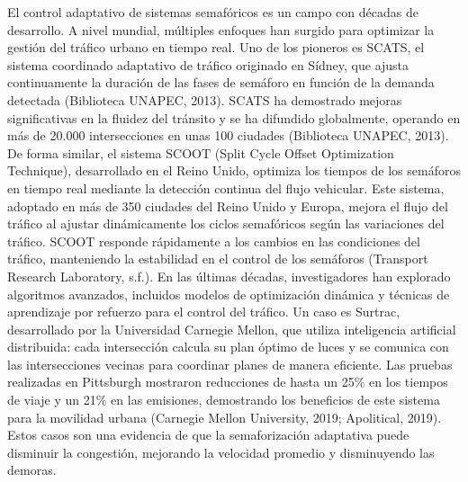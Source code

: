 \documentclass[12pt,a4paper,oneside]{report}
\begin{document}
El control adaptativo de sistemas semafóricos es un campo con décadas de desarrollo. A nivel mundial, múltiples enfoques han surgido para optimizar la gestión del tráfico urbano en tiempo real. Uno de los pioneros es SCATS, el sistema coordinado adaptativo de tráfico originado en Sídney, que ajusta continuamente la duración de las fases de semáforo en función de la demanda detectada (Biblioteca UNAPEC, 2013). SCATS ha demostrado mejoras significativas en la fluidez del tránsito y se ha difundido globalmente, operando en más de 20.000 intersecciones en unas 100 ciudades (Biblioteca UNAPEC, 2013). De forma similar, el sistema SCOOT (Split Cycle Offset Optimization Technique), desarrollado en el Reino Unido, optimiza los tiempos de los semáforos en tiempo real mediante la detección continua del flujo vehicular. Este sistema, adoptado en más de 350 ciudades del Reino Unido y Europa, mejora el flujo del tráfico al ajustar dinámicamente los ciclos semafóricos según las variaciones del tráfico. SCOOT responde rápidamente a los cambios en las condiciones del tráfico, manteniendo la estabilidad en el control de los semáforos (Transport Research Laboratory, s.f.). En las últimas décadas, investigadores han explorado algoritmos avanzados, incluidos modelos de optimización dinámica y técnicas de aprendizaje por refuerzo para el control del tráfico. Un caso es Surtrac, desarrollado por la Universidad Carnegie Mellon, que utiliza inteligencia artificial distribuida: cada intersección calcula su plan óptimo de luces y se comunica con las intersecciones vecinas para coordinar planes de manera eficiente. Las pruebas realizadas en Pittsburgh mostraron reducciones de hasta un 25\% en los tiempos de viaje y un 21\% en las emisiones, demostrando los beneficios de este sistema para la movilidad urbana (Carnegie Mellon University, 2019; Apolitical, 2019). Estos casos son una evidencia de que la semaforización adaptativa puede disminuir la congestión, mejorando la velocidad promedio y disminuyendo las demoras.
\end{document}
